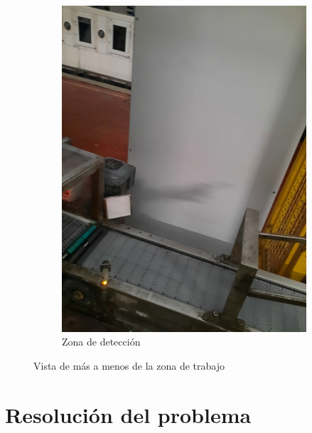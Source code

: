 \documentclass[11pt]{memoir}
\begin{document}
\begin{figure}[H]
\begin{subfigure}{0.3\textwidth}
  \includegraphics[width = \textwidth, angle=270]{img/angulo}
  \caption{Zona de detección}
  \label{fig:angulo}
\end{subfigure}

\caption{Vista de más a menos de la zona de trabajo}
\label{fig:overview}

\end{figure}

\newpage
\section{Resolución del problema}\label{sec:resolucion}
\end{document}
